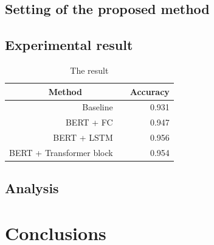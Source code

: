 \documentclass[a4paper]{article}
\begin{document}
\subsection{Setting of the proposed method}

\subsection{Experimental result}

\begin{table}[th]
	\caption{The result}
	\label{tab:example}
	\centering
	\begin{tabular}{ r@{}l  r }
		\toprule
		\multicolumn{2}{c}{\textbf{Method}} & 
		\multicolumn{1}{c}{\textbf{Accuracy}} \\
		\midrule
		Baseline&  & 0.931            \\
		BERT + FC  &                     & 0.947               \\
		BERT + LSTM &                     & 0.956       \\
		BERT + Transformer block&      & 0.954             \\
		\bottomrule
		\end{tabular}
		
	\end{table}



\subsection{Analysis}





\section{Conclusions}







\end{document}
